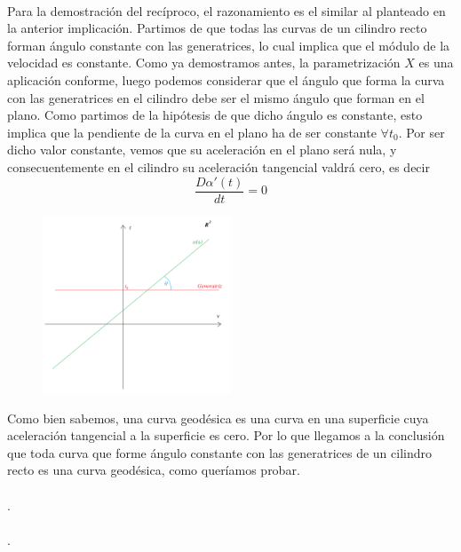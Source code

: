 \documentclass[fleqn]{article}
\begin{document}
    \fbox{$\Leftarrow$}\\

    Para la demostración del recíproco, el razonamiento es el similar al planteado en la anterior implicación. Partimos de que todas las curvas de un cilindro recto forman ángulo 
    constante con las generatrices, lo cual implica que el módulo de la velocidad es constante. Como ya demostramos antes, la parametrización $X$ es una aplicación conforme, 
    luego podemos considerar que el ángulo que forma la curva con las generatrices en el cilindro debe ser el mismo ángulo que forman en el plano. Como partimos de la hipótesis de que 
    dicho ángulo es constante, esto implica que la pendiente de la curva en el plano ha de ser constante $\forall t_0$. Por ser dicho valor constante,
    vemos que su aceleración en el plano será nula, y consecuentemente en el cilindro su aceleración tangencial valdrá cero, es decir
    $$\frac{D\alpha'(t)}{dt} = 0$$

    \begin{figure} %
        \centering
        \includegraphics[width=0.5\textwidth]{ejercicio 5 segunda.png}
    \end{figure}
    
    Como bien sabemos, una curva geodésica es una curva en una superficie cuya aceleración tangencial a la superficie es cero. Por lo que llegamos a la conclusión que 
    toda curva que forme ángulo constante con las generatrices de un cilindro recto es una curva geodésica, como queríamos probar.\\ \\

.\\ \\

.\\ \\
\end{document}

